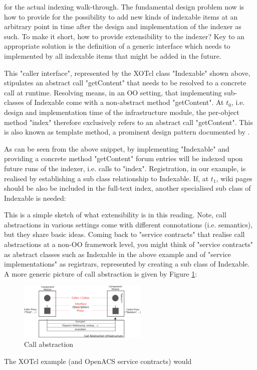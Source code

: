 for the actual indexing walk-through. The fundamental design problem
now is how to provide for the possibility to add new kinds of
indexable items at an arbitrary point in time after the design and
implementation of the indexer as such. To make it short, how to
provide extensibility to the indexer? Key to an appropriate solution
is the definition of a generic interface which needs to implemented by
all indexable items that might be added in the future.
%

%
This "caller interface", represented by the XOTcl class "Indexable"
shown above, stipulates an abstract call "getContent" that needs to be
resolved to a concrete call at runtime. Resolving means, in an OO
setting, that implementing sub-classes of Indexable come with a
non-abstract method "getContent". At \begin{math}t_0\end{math},
i.e. design and implementation time of the infrastructure module, the
per-object method "index" therefore exclusively refers to an abstract
call "getContent". This is also known as template method, a prominent
design pattern documented by \cite{gof:1994}.
%

%
As can be seen from the above snippet, by implementing "Indexable" and
providing a concrete method "getContent" forum entries will be indexed
upon future runs of the indexer, i.e. calls to "index". Registration,
in our example, is realised by establishing a sub class relationship
to Indexable. If, at \begin{math}t_1\end{math}, wiki pages should be
also be included in the full-text index, another specialised sub class
of Indexable is needed:
%

%
This is a simple sketch of what extensibility is in this
reading. Note, call abstractions in various settings come with
different connotations (i.e. semantics), but they share basic
ideas. Coming back to "service contracts" that realise call
abstractions at a non-OO framework level, you might think of "service
contracts" as abstract classes such as Indexable in the above example
and of "service implementations" as registrars, represented by
creating a sub class of Indexable. A more generic picture of call
abstraction is given by Figure \ref{fig:advanced:ca:1}:
  \begin{figure}[htbp]
\begin{center}
\includegraphics[width=0.55\textwidth]{img/call-abstraction-scheme.png}
\caption{Call abstraction}
\label{fig:advanced:ca:1}
\end{center}
\end{figure} The XOTcl example (and OpenACS service contracts) would
